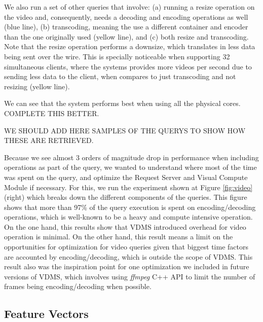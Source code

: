 We also run a set of other queries that involve: (a) running a resize operation
on the video and, consequently, needs a decoding and
encoding operations as well (blue line),
(b) transcoding, meaning the use a different container and encoder
than the one originally used (yellow line), and (c) both resize and transcoding.
Note that the resize operation performs a downsize, which translates in less
data being sent over the wire. This is specially noticeable when supporting 32
simultaneous clients, where the systems provides more videos per second due to
sending less data to the client, when compares to just transcoding and not resizing (yellow line).

We can see that the system performs best when using all the physical cores.
COMPLETE THIS BETTER.

WE SHOULD ADD HERE SAMPLES OF THE QUERYS TO SHOW HOW THESE ARE RETRIEVED.

Because we see almost 3 orders of magnitude drop in performance when including
operations as part of the query, we wanted to understand where most of the time
was spent on the query, and optimize the Request Server and Visual Compute Module
if necessary. For this, we run the experiment shown at
Figure \ref{fig:video} (right) which breaks down the different components of the
queries. This figure shows that more than 97\% of the query execution is spent
on encoding/decoding operations, which is well-known to be a
heavy and compute intensive operation.
On the one hand, this results show that VDMS introduced overhead for
video operation is minimal. On the other hand, this result means a
limit on the opportunities for optimization for video queries given
that biggest time factors are accounted by encoding/decoding, which is
outside the scope of VDMS.
This result also was the inspiration point for one optimization we included
in future versions of VDMS, which involves using \textit{ffmpeg} C++ API to
limit the number of frames being encoding/decoding when possible.


\subsection{Feature Vectors}
\label{features}

